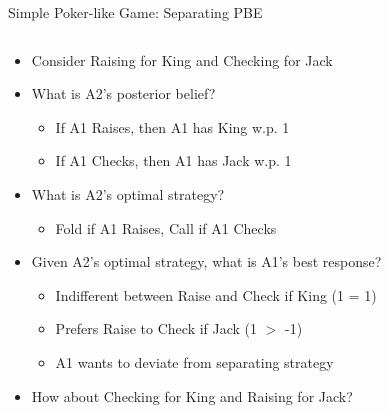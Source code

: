 \documentclass[11pt,aspectratio=169]{beamer}
\begin{document}
  
  \begin{frame}{Simple Poker-like Game: Separating PBE}
   \begin{columns}
    \begin{column}{0.6\textwidth}
     \begin{itemize}[<+->] \scriptsize
     \setlength{\itemsep}{0.7em}
      \item Consider Raising for King and Checking for Jack
      \item What is A2's posterior belief?
      \begin{itemize}\scriptsize
       \item If A1 Raises, then A1 has King w.p. 1
       \item If A1 Checks, then A1 has Jack w.p. 1
      \end{itemize}
      \item What is A2's optimal strategy?
      \begin{itemize}\scriptsize
       \item Fold if A1 Raises, Call if A1 Checks
      \end{itemize}
      \item Given A2's optimal strategy, what is A1's best response?
      \begin{itemize}\scriptsize
       \item Indifferent between Raise and Check if King (1 = 1)
       \item Prefers Raise to Check if Jack (1 $>$ -1)
       \item A1 wants to \alert{deviate} from separating strategy
      \end{itemize}
      \item How about Checking for King and Raising for Jack?
     \end{itemize}
    \end{column}
    \begin{column}{0.4\textwidth}   
     \begin{center}
\end{center}
\end{column}
\end{columns}
\end{frame}
\end{document}
